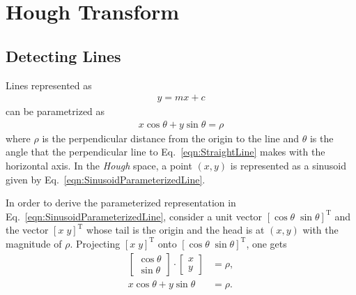 \documentclass{report}
\begin{document}

\section{Hough Transform}
\subsection{Detecting Lines}
\hspace{\parindent}Lines represented as 
\begin{align}
	y = mx + c
	\label{eqn:StraightLine}
\end{align}
can be parametrized as
\begin{align}
	x \cos{\theta} + y \sin{\theta} = \rho
	\label{eqn:SinusoidParameterizedLine}
\end{align}
where $\rho$ is the perpendicular distance from the origin to the line and $\theta$ is the angle that the perpendicular line to Eq.~\ref{eqn:StraightLine} makes with the horizontal axis. In the \textit{Hough} space, a point $(x,y)$ is represented as a sinusoid given by Eq.~\ref{eqn:SinusoidParameterizedLine}.

In order to derive the parameterized representation in Eq.~\ref{eqn:SinusoidParameterizedLine}, consider a unit vector $[ \cos{\theta} \; \sin{\theta} ]^\text{T}$ and the vector $[x \; y]^{\text{T}}$ whose tail is the origin and the head is at $(x,y)$ with the magnitude of $\rho$. Projecting $[x \; y]^{\text{T}}$ onto $[ \cos{\theta} \; \sin{\theta} ]^\text{T}$, one gets
\begin{align}
	\begin{bmatrix}
		\cos{\theta} \\
		\sin{\theta}
	\end{bmatrix}
	\cdot
	\begin{bmatrix}
		x \\
		y
	\end{bmatrix}
	& = \rho, \\
	x \cos{\theta} + y \sin{\theta} & = \rho.
	\label{eqn:SinusoidParameterizedLineDerivation}
\end{align}

%	
%	
\end{document}
